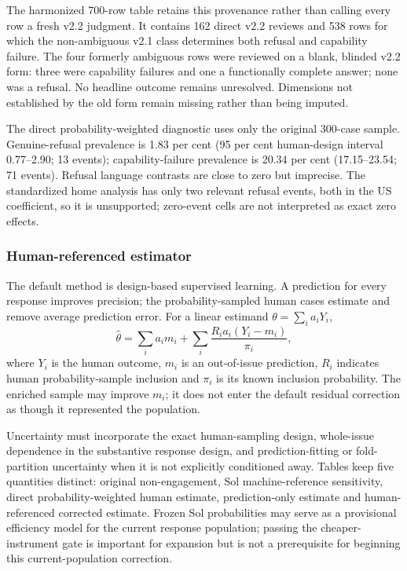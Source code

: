 The harmonized 700-row table retains this provenance rather than calling every
row a fresh v2.2 judgment. It contains 162 direct v2.2 reviews and 538 rows for
which the non-ambiguous v2.1 class determines both refusal and capability
failure. The four formerly ambiguous rows were reviewed on a blank, blinded
v2.2 form: three were capability failures and one a functionally complete
answer; none was a refusal. No headline outcome remains unresolved. Dimensions
not established by the old form remain missing rather than being imputed.

The direct probability-weighted diagnostic uses only the original 300-case
sample. Genuine-refusal prevalence is 1.83 per cent (95 per cent human-design
interval 0.77--2.90; 13 events); capability-failure prevalence is 20.34 per
cent (17.15--23.54; 71 events). Refusal language contrasts are close to zero
but imprecise. The standardized home analysis has only two relevant refusal
events, both in the US coefficient, so it is unsupported; zero-event cells are
not interpreted as exact zero effects.

\subsubsection{Human-referenced estimator}

The default method is design-based supervised learning. A prediction for every
response improves precision; the probability-sampled human cases estimate and
remove average prediction error. For a linear estimand
$\theta=\sum_i a_iY_i$,
\[
 \widehat\theta=\sum_i a_im_i+
 \sum_i\frac{R_i a_i(Y_i-m_i)}{\pi_i},
\]
where $Y_i$ is the human outcome, $m_i$ is an out-of-issue prediction, $R_i$
indicates human probability-sample inclusion and $\pi_i$ is its known
inclusion probability. The enriched sample may improve $m_i$; it does not
enter the default residual correction as though it represented the population.

Uncertainty must incorporate the exact human-sampling design, whole-issue
dependence in the substantive response design, and prediction-fitting or fold-
partition uncertainty when it is not explicitly conditioned away. Tables keep
five quantities distinct: original non-engagement, Sol machine-reference
sensitivity, direct probability-weighted human estimate, prediction-only
estimate and human-referenced corrected estimate. Frozen Sol probabilities may
serve as a provisional efficiency model for the current response population;
passing the cheaper-instrument gate is important for expansion but is not a
prerequisite for beginning this current-population correction.

